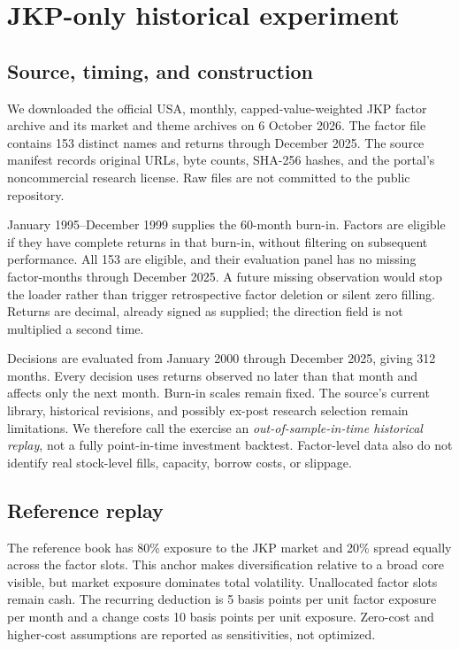 \section{JKP-only historical experiment}\label{sec:jkp}
\subsection{Source, timing, and construction}
We downloaded the official USA, monthly, capped-value-weighted JKP factor archive and its market and theme archives on 6 October 2026. The factor file contains 153 distinct names and returns through December 2025. The source manifest records original URLs, byte counts, SHA-256 hashes, and the portal's noncommercial research license. Raw files are not committed to the public repository.

January 1995--December 1999 supplies the 60-month burn-in. Factors are eligible if they have complete returns in that burn-in, without filtering on subsequent performance. All 153 are eligible, and their evaluation panel has no missing factor-months through December 2025. A future missing observation would stop the loader rather than trigger retrospective factor deletion or silent zero filling. Returns are decimal, already signed as supplied; the direction field is not multiplied a second time.

Decisions are evaluated from January 2000 through December 2025, giving 312 months. Every decision uses returns observed no later than that month and affects only the next month. Burn-in scales remain fixed. The source's current library, historical revisions, and possibly ex-post research selection remain limitations. We therefore call the exercise an \emph{out-of-sample-in-time historical replay}, not a fully point-in-time investment backtest. Factor-level data also do not identify real stock-level fills, capacity, borrow costs, or slippage.

\subsection{Reference replay}
The reference book has 80\% exposure to the JKP market and 20\% spread equally across the factor slots. This anchor makes diversification relative to a broad core visible, but market exposure dominates total volatility. Unallocated factor slots remain cash. The recurring deduction is 5 basis points per unit factor exposure per month and a change costs 10 basis points per unit exposure. Zero-cost and higher-cost assumptions are reported as sensitivities, not optimized.

